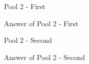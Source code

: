 \begin{question}
Pool 2 - First
\end{question}
\begin{solution}
Answer of Pool 2 - First
\end{solution}

\begin{question}
Pool 2 - Second
\end{question}
\begin{solution}
Answer of Pool 2 - Second
\end{solution}
